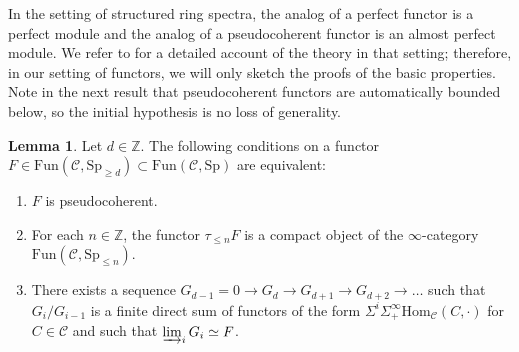 \documentclass{amsart}
\renewcommand{\hom}{\mathrm{Hom}}
\newcommand{\Sp}{\mathrm{Sp}}
\newcommand{\fun}{\mathrm{Fun}}
\theoremstyle{definition}
\newtheorem{lemma}[definition]{Lemma}
\begin{document}
In the setting of structured ring spectra, the analog of a perfect functor is a
perfect module and the analog of a pseudocoherent functor is an almost perfect
module. We refer to \cite[7.2.4]{HA} for a detailed account of the theory in
that setting; therefore, in our setting of functors, we will only sketch the
proofs of the basic properties.
Note in the next result that pseudocoherent functors are automatically bounded
below, so the initial hypothesis is no loss of generality. 
\begin{lemma} 
\label{pscohcompact}
Let $d \in \mathbb{Z}$. The following conditions on a functor $F \in \fun(\mathcal{C}, \Sp_{\geq d})
\subset \fun(\mathcal{C}, \Sp)$ are equivalent:
\begin{enumerate}
\item $F$ is pseudocoherent.
\item For each $n \in \mathbb{Z}$, the functor $\tau_{\leq n} F$ is a compact object of the
$\infty$-category $\fun(\mathcal{C}, \Sp_{\leq n})$. 
\item There exists a sequence $G_{d-1} = 0 \to G_d \to G_{d+1} \to G_{d+2} \to \dots $ such that 
$G_i/G_{i-1}$ is a finite direct sum of functors of the form $\Sigma^i
\Sigma^\infty_+ \hom_{\mathcal{C}}(C, \cdot)$ for $C \in \mathcal{C}$ and such that
$\varinjlim_i G_i \simeq F$. 
\end{enumerate}
\end{lemma} 
\end{document}
